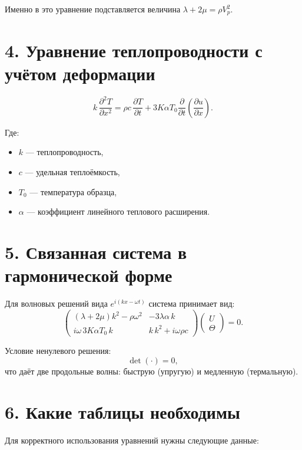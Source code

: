 \documentclass[12pt]{article}
\begin{document}
Именно в это уравнение подставляется величина $\lambda+2\mu = \rho V_p^2$.

\section*{4. Уравнение теплопроводности с учётом деформации}

\begin{equation}
k\,\frac{\partial^2 T}{\partial x^2}
=
\rho c\,\frac{\partial T}{\partial t}
+
3K\alpha T_0 \frac{\partial}{\partial t}\left(\frac{\partial u}{\partial x}\right).
\end{equation}

Где:
\begin{itemize}
    \item $k$ — теплопроводность,
    \item $c$ — удельная теплоёмкость,
    \item $T_0$ — температура образца,
    \item $\alpha$ — коэффициент линейного теплового расширения.
\end{itemize}

\section*{5. Связанная система в гармонической форме}

Для волновых решений вида $e^{i(kx-\omega t)}$ система принимает вид:
\begin{equation}
\begin{pmatrix}
(\lambda+2\mu)k^2 - \rho\omega^2 & -3\lambda\alpha\,k \\
i\omega\,3K\alpha T_0\,k & k\,k^2 + i\omega\rho c
\end{pmatrix}
\begin{pmatrix}
U\\
\Theta
\end{pmatrix}
= 0.
\end{equation}

Условие ненулевого решения:
\begin{equation}
\det(\cdot)=0,
\end{equation}
что даёт две продольные волны:
быструю (упругую) и медленную (термальную).

\section*{6. Какие таблицы необходимы}

Для корректного использования уравнений нужны следующие данные:
\end{document}
